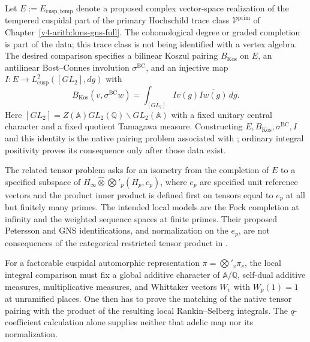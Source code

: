 \begin{remark}
\label{v4-arith:pres57:native-pairing}
Let $E:=E_{\mathrm{cusp,temp}}$ denote a proposed complex vector-space
realization of the tempered cuspidal part of the primary
Hochschild trace class $\mathcal V^{\mathrm{prim}}$ of
Chapter~\ref{v4-arith:kms-gns-full}. The cohomological degree or graded completion is part of the data;
this trace class is not being identified with a vertex algebra.
The desired comparison
specifies a bilinear Koszul pairing $B_{\mathrm{Kos}}$ on $E$, an
antilinear Bost--Connes involution $\sigma^{\mathrm{BC}}$, and an
injective map $I:E\to L^2_{\mathrm{cusp}}([GL_2],dg)$ with
\[
 B_{\mathrm{Kos}}(v,\sigma^{\mathrm{BC}}w)
 =\int_{[GL_2]}Iv(g)\overline{Iw(g)}\,dg.
\]
Here $[GL_2]=Z(\mathbb A)GL_2(\mathbb Q)\backslash GL_2(\mathbb A)$
with a fixed unitary central character and a fixed quotient Tamagawa
measure. Constructing $E,B_{\mathrm{Kos}},\sigma^{\mathrm{BC}},I$ and
this identity is the native pairing problem associated with
; ordinary integral
positivity proves its consequence only after those data exist.

The related tensor problem asks for an isometry from the completion
of $E$ to a specified subspace of
$H_\infty\widehat\otimes\bigotimes'_p(H_p,e_p)$, where $e_p$ are
specified unit reference vectors and the product inner product is
defined first on tensors equal to $e_p$ at all but finitely many primes.
The intended local models are the Fock completion at infinity and
the weighted sequence spaces at finite primes. Their proposed
Petersson and GNS identifications, and normalization on the $e_p$,
are not consequences of the categorical restricted tensor product in
.

For a factorable cuspidal automorphic representation $\pi=\bigotimes'_v\pi_v$,
the local integral comparison must fix a global additive character
of $\mathbb A/\mathbb Q$, self-dual additive measures, multiplicative
measures, and Whittaker vectors $W_v$ with $W_p(1)=1$ at unramified
places. One then has to prove the matching of the native tensor
pairing with the product of the resulting local Rankin--Selberg
integrals. The $q$-coefficient calculation alone supplies neither
that adelic map nor its normalization.
\end{remark}

